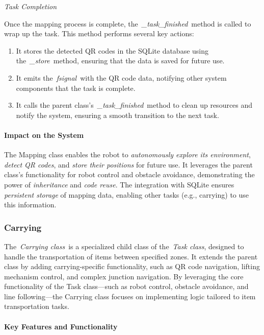 \documentclass[a4paper,12pt]{extreport}
\begin{document}
\emph{Task Completion}

Once the mapping process is complete, the~\emph{\_task\_finished}~method
is called to wrap up the task. This method performs several key actions:

\begin{enumerate}
\def\labelenumi{\arabic{enumi}.}
\item
  It stores the detected QR codes in the SQLite database using
  the~\emph{\_store}~method, ensuring that the data is saved for future
  use.
\item
  It emits the~\emph{fsignal}~with the QR code data, notifying other
  system components that the task is complete.
\item
  It calls the parent class's~\emph{\_task\_finished}~method to clean up
  resources and notify the system, ensuring a smooth transition to the
  next task.
\end{enumerate}

\paragraph{Impact on the System}

The Mapping class enables the robot to \emph{autonomously explore its
environment}, \emph{detect QR codes}, and \emph{store their positions}
for future use. It leverages the parent class's functionality for robot
control and obstacle avoidance, demonstrating the power of
\emph{inheritance} and \emph{code reuse}. The integration with SQLite
ensures \emph{persistent storage} of mapping data, enabling other tasks
(e.g., carrying) to use this information.

\subsubsection{Carrying}

The~\emph{Carrying class}~is a specialized child class of the~\emph{Task
class}, designed to handle the transportation of items between specified
zones. It extends the parent class by adding carrying-specific
functionality, such as QR code navigation, lifting mechanism control,
and complex junction navigation. By leveraging the core functionality of
the Task class---such as robot control, obstacle avoidance, and line
following---the Carrying class focuses on implementing logic tailored to
item transportation tasks.

\paragraph{Key Features and Functionality}
\end{document}
